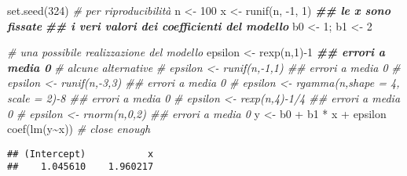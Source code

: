 \documentclass[
]{article}
\newenvironment{Shaded}{\begin{snugshade}}{\end{snugshade}}
\newcommand{\AttributeTok}[1]{\textcolor[rgb]{0.77,0.63,0.00}{#1}}
\newcommand{\CommentTok}[1]{\textcolor[rgb]{0.56,0.35,0.01}{\textit{#1}}}
\newcommand{\ControlFlowTok}[1]{\textcolor[rgb]{0.13,0.29,0.53}{\textbf{#1}}}
\newcommand{\DecValTok}[1]{\textcolor[rgb]{0.00,0.00,0.81}{#1}}
\newcommand{\DocumentationTok}[1]{\textcolor[rgb]{0.56,0.35,0.01}{\textbf{\textit{#1}}}}
\newcommand{\FunctionTok}[1]{\textcolor[rgb]{0.00,0.00,0.00}{#1}}
\newcommand{\NormalTok}[1]{#1}
\newcommand{\OtherTok}[1]{\textcolor[rgb]{0.56,0.35,0.01}{#1}}
\newcommand{\SpecialCharTok}[1]{\textcolor[rgb]{0.00,0.00,0.00}{#1}}
\begin{document}
\begin{Shaded}
\begin{Highlighting}[]
\FunctionTok{set.seed}\NormalTok{(}\DecValTok{324}\NormalTok{) }\CommentTok{\# per riproducibilità }
\NormalTok{n }\OtherTok{\textless{}{-}} \DecValTok{100} 
\NormalTok{x }\OtherTok{\textless{}{-}} \FunctionTok{runif}\NormalTok{(n, }\SpecialCharTok{{-}}\DecValTok{1}\NormalTok{, }\DecValTok{1}\NormalTok{)}
\DocumentationTok{\#\# le x sono fissate}
\DocumentationTok{\#\# i veri valori dei coefficienti del modello }
\NormalTok{b0 }\OtherTok{\textless{}{-}} \DecValTok{1}\NormalTok{; b1 }\OtherTok{\textless{}{-}} \DecValTok{2}

\CommentTok{\# una possibile realizzazione del modello }
\NormalTok{epsilon }\OtherTok{\textless{}{-}} \FunctionTok{rexp}\NormalTok{(n,}\DecValTok{1}\NormalTok{)}\SpecialCharTok{{-}}\DecValTok{1} \DocumentationTok{\#\# errori a media 0 }
\CommentTok{\# alcune alternative }
\CommentTok{\# epsilon \textless{}{-} runif(n,{-}1,1) \#\# errori a media 0 }
\CommentTok{\# epsilon \textless{}{-} runif(n,{-}3,3) \#\# errori a media 0 }
\CommentTok{\# epsilon \textless{}{-} rgamma(n,shape = 4, scale = 2){-}8  \#\# errori a media 0 }
\CommentTok{\# epsilon \textless{}{-} rexp(n,4){-}1/4 \#\# errori a media 0 }
\CommentTok{\# epsilon \textless{}{-} rnorm(n,0,2) \#\# errori a media 0 }
\NormalTok{y }\OtherTok{\textless{}{-}}\NormalTok{ b0 }\SpecialCharTok{+}\NormalTok{ b1 }\SpecialCharTok{*}\NormalTok{ x }\SpecialCharTok{+}\NormalTok{ epsilon}
\FunctionTok{coef}\NormalTok{(}\FunctionTok{lm}\NormalTok{(y}\SpecialCharTok{\textasciitilde{}}\NormalTok{x)) }\CommentTok{\# close enough }
\end{Highlighting}
\end{Shaded}

\begin{verbatim}
## (Intercept)           x 
##    1.045610    1.960217
\end{verbatim}

\begin{Shaded}
\end{Shaded}
\end{document}
